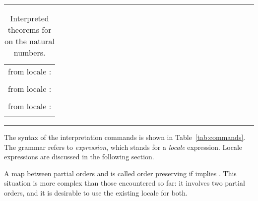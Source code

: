 \begin{isabellebody}
\begin{isamarkuptext}
\begin{table}
\hrule
\vspace{2ex}
\begin{center}
\begin{tabular}{l}
  \isa{nat{\isacharunderscore}dvd{\isachardot}less{\isacharunderscore}def} from locale \isa{partial{\isacharunderscore}order}: \\
  \quad \isa{{\isacharparenleft}{\isacharquery}x\ dvd\ {\isacharquery}y\ {\isasymand}\ {\isacharquery}x\ {\isasymnoteq}\ {\isacharquery}y{\isacharparenright}\ {\isacharequal}\ {\isacharparenleft}{\isacharquery}x\ dvd\ {\isacharquery}y\ {\isasymand}\ {\isacharquery}x\ {\isasymnoteq}\ {\isacharquery}y{\isacharparenright}} \\
  \isa{nat{\isacharunderscore}dvd{\isachardot}meet{\isacharunderscore}left} from locale \isa{lattice}: \\
  \quad \isa{gcd\ {\isacharquery}x\ {\isacharquery}y\ dvd\ {\isacharquery}x} \\
  \isa{nat{\isacharunderscore}dvd{\isachardot}join{\isacharunderscore}distr} from locale \isa{distrib{\isacharunderscore}lattice}: \\
  \quad \isa{lcm\ {\isacharquery}x\ {\isacharparenleft}gcd\ {\isacharquery}y\ {\isacharquery}z{\isacharparenright}\ {\isacharequal}\ gcd\ {\isacharparenleft}lcm\ {\isacharquery}x\ {\isacharquery}y{\isacharparenright}\ {\isacharparenleft}lcm\ {\isacharquery}x\ {\isacharquery}z{\isacharparenright}} \\
\end{tabular}
\end{center}
\hrule
\caption{Interpreted theorems for  on the natural numbers.}
\label{tab:nat-dvd-lattice}
\end{table}%
\end{isamarkuptext}%
\isamarkuptrue%
%
\begin{isamarkuptext}%
The syntax of the interpretation commands is shown in
  Table~\ref{tab:commands}.  The grammar refers to
  \textit{expression}, which stands for a \emph{locale} expression.
  Locale expressions are discussed in the following section.%
\end{isamarkuptext}%
\isamarkuptrue%
%
\isamarkuptrue%
%
\begin{isamarkuptext}%
A map \isa{{\isasymphi}} between partial orders \isa{{\isasymsqsubseteq}} and \isa{{\isasympreceq}}
  is called order preserving if  implies .  This situation is more complex than those encountered so
  far: it involves two partial orders, and it is desirable to use the
  existing locale for both.


\end{isamarkuptext}
\end{isabellebody}
